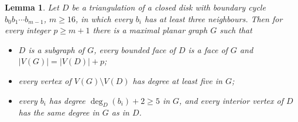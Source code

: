 \documentclass[12pt,a4paper]{article}%
\newtheorem{lemma}[theorem]{Lemma}
\begin{document}


\begin{lemma}
\label{Lemma_closure}Let $D$ be a triangulation of a closed disk with boundary cycle $b_{0}b_{1}\cdots b_{m-1}$,
$m\geq 16$, in which every $b_{i}$ has at least three neighbours. Then for every integer $p\geq m+1$ there is a
maximal planar graph $G$ such that

\begin{itemize}
\item[\textrm{(i)}] $D$ is a subgraph of $G$, every bounded face of $D$ is a face of $G$ and $|V(G)|=|V(D)|+p$;
\item[\textrm{(ii)}] every vertex of $V(G)\setminus V(D)$ has degree at least five in $G$;
\item[\textrm{(iii)}] every $b_{i}$ has degree $\deg_{D}(b_{i})+2\geq 5$ in $G$, and every interior vertex of $D$
has the same degree in $G$ as in $D$.
\end{itemize}
\end{lemma}
\end{document}

